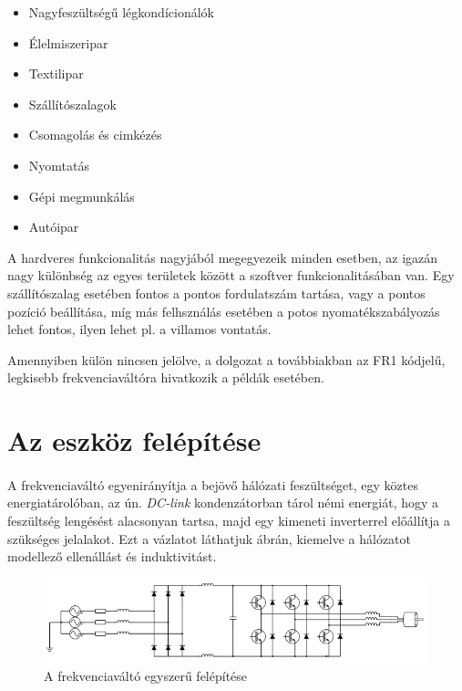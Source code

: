 \begin{itemize}
	\item{Nagyfeszültségű légkondícionálók}
	\item{Élelmiszeripar}
	\item{Textilipar}
	\item{Szállítószalagok}
	\item{Csomagolás és cimkézés}
	\item{Nyomtatás}
	\item{Gépi megmunkálás}
	\item{Autóipar}
\end{itemize}

A hardveres funkcionalitás nagyjából megegyezeik minden esetben, az igazán nagy különbség az egyes területek között a szoftver funkcionalitásában van. Egy szállítószalag esetében fontos a pontos fordulatszám tartása, vagy a pontos pozíció beállítása, míg más felhsználás esetében a potos nyomatékszabályozás lehet fontos, ilyen lehet pl. a villamos vontatás.

Amennyiben külön nincsen jelölve, a dolgozat a továbbiakban az FR1 kódjelű, legkisebb frekvenciaváltóra hivatkozik a példák esetében.

\section{Az eszköz felépítése}

\paragraph{}
A frekvenciaváltó egyenirányítja a bejövő hálózati feszültséget, egy köztes energiatárolóban, az ún. \emph{DC-link} kondenzátorban tárol némi energiát, hogy a feszültség lengésést alacsonyan tartsa, majd egy kimeneti inverterrel előállítja a szükséges jelalakot. Ezt a vázlatot láthatjuk  ábrán, kiemelve a hálózatot modellező ellenállást és induktivitást.

\begin{figure}[h]
	\centering
	\includegraphics[width = \textwidth]{figures/VFDschematic_choke.png}
	\caption{A frekvenciaváltó egyszerű felépítése} 
	\label{fig:vfd_schema}
\end{figure}

